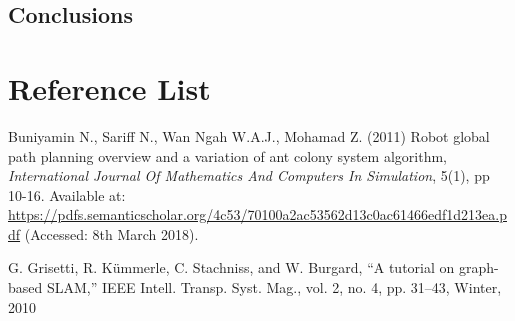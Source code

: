 \documentclass[a4paper, 12pt]{article}
\begin{document}
\subsection{Conclusions}
\section{Reference List}

Buniyamin N., Sariff N., Wan Ngah W.A.J., Mohamad Z. (2011) Robot global path planning overview and a variation of ant colony system algorithm, \textit{International Journal Of Mathematics And Computers In Simulation},
5(1), pp 10-16. Available at: \url{https://pdfs.semanticscholar.org/4c53/70100a2ac53562d13c0ac61466edf1d213ea.pdf} (Accessed: 8th March 2018).   

G. Grisetti, R. Kümmerle, C. Stachniss, and W. Burgard, “A tutorial
on graph-based SLAM,” IEEE Intell. Transp. Syst. Mag., vol. 2, no. 4,
pp. 31–43, Winter, 2010
\end{document}

